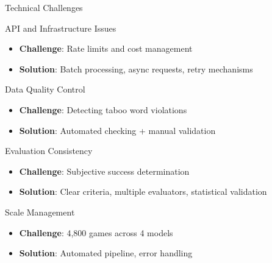 \documentclass[aspectratio=169]{beamer}
\begin{document}
\begin{frame}{Technical Challenges}
\begin{block}{API and Infrastructure Issues}
\begin{itemize}
    \item \textbf{Challenge}: Rate limits and cost management
    \item \textbf{Solution}: Batch processing, async requests, retry mechanisms
\end{itemize}
\end{block}

\begin{block}{Data Quality Control}
\begin{itemize}
    \item \textbf{Challenge}: Detecting taboo word violations
    \item \textbf{Solution}: Automated checking + manual validation
\end{itemize}
\end{block}

\begin{block}{Evaluation Consistency}
\begin{itemize}
    \item \textbf{Challenge}: Subjective success determination
    \item \textbf{Solution}: Clear criteria, multiple evaluators, statistical validation
\end{itemize}
\end{block}

\begin{block}{Scale Management}
\small
\begin{itemize}
    \item \textbf{Challenge}: 4,800 games across 4 models
    \item \textbf{Solution}: Automated pipeline, error handling
\end{itemize}
\end{block}
\end{frame}
\end{document}

